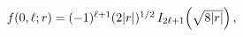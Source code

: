 $\mathop{f\/}\nolimits\!\left(0,\ell;r\right)=(-1)^{\ell+1}(2|r|)^{1/2}\mathop{%
I_{2\ell+1}\/}\nolimits\!\left(\sqrt{8|r|}\right),$